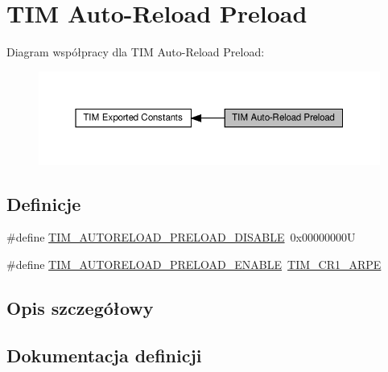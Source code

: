 \hypertarget{group___t_i_m___auto_reload_preload}{}\section{T\+IM Auto-\/\+Reload Preload}
\label{group___t_i_m___auto_reload_preload}
Diagram współpracy dla T\+IM Auto-\/\+Reload Preload\+:\nopagebreak
\begin{figure}[H]
\begin{center}
\leavevmode
\includegraphics[width=350pt]{group___t_i_m___auto_reload_preload}
\end{center}
\end{figure}
\subsection*{Definicje}
\begin{DoxyCompactItemize}
\item 
\#define \hyperlink{group___t_i_m___auto_reload_preload_ga4d0cf7e2800d0ab10f3f0ebfac11c9c7}{T\+I\+M\+\_\+\+A\+U\+T\+O\+R\+E\+L\+O\+A\+D\+\_\+\+P\+R\+E\+L\+O\+A\+D\+\_\+\+D\+I\+S\+A\+B\+LE}~0x00000000U
\item 
\#define \hyperlink{group___t_i_m___auto_reload_preload_gaaa36f0c74b1d1ec83b0c105bfedfa309}{T\+I\+M\+\_\+\+A\+U\+T\+O\+R\+E\+L\+O\+A\+D\+\_\+\+P\+R\+E\+L\+O\+A\+D\+\_\+\+E\+N\+A\+B\+LE}~\hyperlink{group___peripheral___registers___bits___definition_ga4a3ad409f6b147cdcbafbfe29102f3fd}{T\+I\+M\+\_\+\+C\+R1\+\_\+\+A\+R\+PE}
\end{DoxyCompactItemize}


\subsection{Opis szczegółowy}


\subsection{Dokumentacja definicji}
\mbox{\label{group___t_i_m___auto_reload_preload_ga4d0cf7e2800d0ab10f3f0ebfac11c9c7}} 
